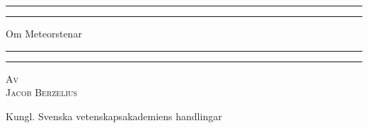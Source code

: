 \documentclass[a4paper, 12pt, oneside, swedish]{article}
\begin{document}
\begin{titlepage} %
	\centering %
	\scshape %

	
	\rule{\textwidth}{1.6pt}\vspace*{-\baselineskip}\vspace*{2pt} %
	\rule{\textwidth}{0.4pt} %
	
	\vspace{0.75\baselineskip} %

        {\LARGE Om Meteorstenar} %
	
	\vspace{0.75\baselineskip} %
	
	\rule{\textwidth}{0.4pt}\vspace*{-\baselineskip}\vspace{3.2pt} %
	\rule{\textwidth}{1.6pt} %
	
	\vspace{1\baselineskip} %
	
	
	{\scshape Av\\ \Large Jacob Berzelius} %
	
	\vspace*{1\baselineskip} %
	


	\vspace{1\baselineskip} %

    {\small Kungl. Svenska vetenskapsakademiens handlingar}

	
	


\end{titlepage}
\end{document}
